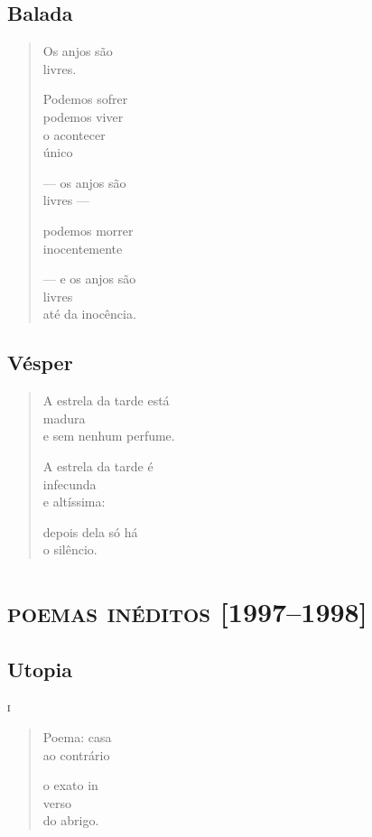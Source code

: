 \chapter{Balada}

\begin{verse}
Os anjos são\\
livres.

Podemos sofrer\\
podemos viver\\
o acontecer\\
único

--- os anjos são\\
livres ---

podemos morrer\\
inocentemente

--- e os anjos são\\
livres\\
até da inocência.
\end{verse}

\chapter{Vésper}

\begin{verse}
A estrela da tarde está\\
madura\\
e sem nenhum perfume.

A estrela da tarde é\\
infecunda\\
e altíssima:

depois dela só há\\
o silêncio.
\end{verse}

\part{\textsc{poemas inéditos} {[}1997--1998{]}}

\chapter{Utopia}

\forceindent\textsc{i}

\begin{verse}
Poema: casa\\
ao contrário

o exato in\\
verso\\
do abrigo.
\end{verse}

